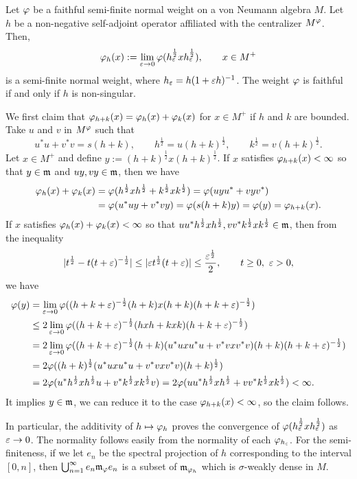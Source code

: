 \documentclass{../../../small}
\begin{document}
\begin{prop}
Let $\varphi$ be a faithful semi-finite normal weight on a von Neumann algebra $M$.
Let $h$ be a non-negative self-adjoint operator affiliated with the centralizer $M^\varphi$.
Then,
\[\varphi_h(x):=\lim_{\varepsilon\to0}\varphi(h_\varepsilon^{\frac12}xh_\varepsilon^{\frac12}),\qquad x\in M^+\]
is a semi-finite normal weight, where $h_\varepsilon=h(1+\varepsilon h)^{-1}$.
The weight $\varphi$ is faithful if and only if $h$ is non-singular.
\end{prop}
\begin{pf}
We first claim that $\varphi_{h+k}(x)=\varphi_h(x)+\varphi_k(x)$ for $x\in M^+$ if $h$ and $k$ are bounded.
Take $u$ and $v$ in $M^\varphi$ such that
\[u^*u+v^*v=s(h+k),\qquad h^{\frac12}=u(h+k)^{\frac12},\qquad k^{\frac12}=v(h+k)^{\frac12}.\]
Let $x\in M^+$ and define $y:=(h+k)^{\frac12}x(h+k)^{\frac12}$.
If $x$ satisfies $\varphi_{h+k}(x)<\infty$ so that $y\in\mathfrak{m}$ and $uy,vy\in\mathfrak{m}$, then we have
\begin{align*}
\varphi_h(x)+\varphi_k(x)
&=\varphi(h^{\frac12}xh^{\frac12}+k^{\frac12}xk^{\frac12})
=\varphi(uyu^*+vyv^*)\\
&=\varphi(u^*uy+v^*vy)=\varphi(s(h+k)y)=\varphi(y)=\varphi_{h+k}(x).
\end{align*}
If $x$ satisfies $\varphi_h(x)+\varphi_k(x)<\infty$ so that $uu^*h^{\frac12}xh^{\frac12},vv^*k^{\frac12}xk^{\frac12}\in\mathfrak{m}$, then from the inequality
\[|t^{\frac12}-t(t+\e)^{-\frac12}|\le|\e t^{\frac12}(t+\e)|\le\frac{\e^{\frac12}}2,\qquad t\ge0,\ \e>0,\]
we have
\begin{align*}
\varphi(y)
&=\lim_{\varepsilon\to0}\varphi((h+k+\varepsilon)^{-\frac12}(h+k)x(h+k)(h+k+\varepsilon)^{-\frac12})\\
&\le2\lim_{\varepsilon\to0}\varphi((h+k+\varepsilon)^{-\frac12}(hxh+kxk)(h+k+\varepsilon)^{-\frac12})\\
&=2\lim_{\varepsilon\to0}\varphi((h+k+\varepsilon)^{-\frac12}(h+k)(u^*uxu^*u+v^*vxv^*v)(h+k)(h+k+\varepsilon)^{-\frac12})\\
&=2\varphi((h+k)^{\frac12}(u^*uxu^*u+v^*vxv^*v)(h+k)^{\frac12})\\
&=2\varphi(u^*h^{\frac12}xh^{\frac12}u+v^*k^{\frac12}xk^{\frac12}v)
=2\varphi(uu^*h^{\frac12}xh^{\frac12}+vv^*k^{\frac12}xk^{\frac12})<\infty.
\end{align*}
It implies $y\in\mathfrak{m}$, we can reduce it to the case $\varphi_{h+k}(x)<\infty$, so the claim follows.

In particular, the additivity of $h\mapsto\varphi_h$ proves the convergence of $\varphi(h_\varepsilon^{\frac12}xh_\varepsilon^{\frac12})$ as $\varepsilon\to0$.
The normality follows easily from the normality of each $\varphi_{h_\varepsilon}$.
For the semi-finiteness, if we let $e_n$ be the spectral projection of $h$ corresponding to the interval $[0,n]$, then $\bigcup_{n=1}^\infty e_n\mathfrak{m}_\varphi e_n$ is a subset of $\mathfrak{m}_{\varphi_h}$ which is $\sigma$-weakly dense in $M$.
\end{pf}
\end{document}
